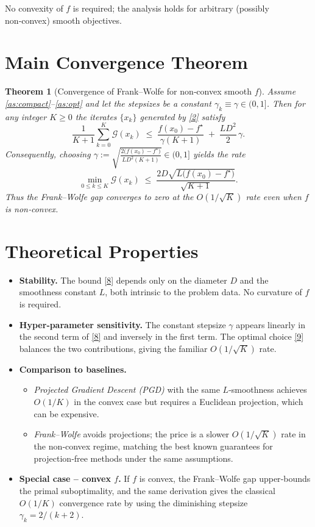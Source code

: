 \documentclass{article}
\newtheorem{theorem}{Theorem}
\newcommand{\gap}{\mathcal{G}}
\begin{document}
No convexity of $f$ is required; the analysis holds for arbitrary (possibly non‑convex) smooth objectives.

\section*{Main Convergence Theorem}
\begin{theorem}[Convergence of Frank–Wolfe for non‑convex smooth $f$]\label{thm:main}
Assume \ref{as:compact}–\ref{as:opt} and let the stepsizes be a constant $\gamma_k\equiv\gamma\in(0,1]$. Then for any integer $K\ge0$ the iterates $\{x_k\}$ generated by \eqref{2} satisfy
\[
\frac{1}{K+1}\sum_{k=0}^{K}\gap(x_k)
\;\le\;
\frac{f(x_0)-f^\star}{\gamma (K+1)}\;+\;\frac{L D^{2}}{2}\,\gamma .
\tag{8}
\]
Consequently, choosing $\displaystyle\gamma:=\sqrt{\frac{2\big(f(x_0)-f^\star\big)}{L D^{2}(K+1)}}\in(0,1]$ yields the rate
\[
\min_{0\le k\le K}\gap(x_k)\;\le\;
\frac{2D\sqrt{L\big(f(x_0)-f^\star\big)}}{\sqrt{K+1}} .
\tag{9}
\]
Thus the Frank–Wolfe gap converges to zero at the $O(1/\sqrt{K})$ rate even when $f$ is non‑convex.
\end{theorem}

\section*{Theoretical Properties}
\begin{itemize}
\item \textbf{Stability.} The bound \eqref{8} depends only on the diameter $D$ and the smoothness constant $L$, both intrinsic to the problem data. No curvature of $f$ is required.
\item \textbf{Hyper‑parameter sensitivity.} The constant stepsize $\gamma$ appears linearly in the second term of \eqref{8} and inversely in the first term. The optimal choice \eqref{9} balances the two contributions, giving the familiar $O(1/\sqrt{K})$ rate.
\item \textbf{Comparison to baselines.}
    \begin{itemize}
        \item \emph{Projected Gradient Descent (PGD)} with the same $L$‑smoothness achieves $O(1/K)$ in the convex case but requires a Euclidean projection, which can be expensive.
        \item \emph{Frank–Wolfe} avoids projections; the price is a slower $O(1/\sqrt{K})$ rate in the non‑convex regime, matching the best known guarantees for projection‑free methods under the same assumptions.
    \end{itemize}
\item \textbf{Special case – convex $f$.} If $f$ is convex, the Frank–Wolfe gap upper‑bounds the primal suboptimality, and the same derivation gives the classical $O(1/K)$ convergence rate by using the diminishing stepsize $\gamma_k=2/(k+2)$.
\end{itemize}
\end{document}
